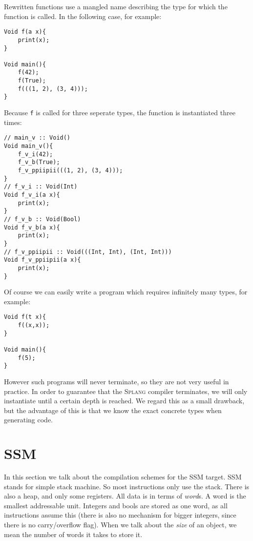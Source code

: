 \documentclass[14pt]{amsart}
\newcommand{\splang}{\textsc{Splang}\xspace}
\begin{document}
Rewritten functions use a mangled name describing the type for which the function is called. In the following case, for example:

\begin{lstlisting}
Void f(a x){
	print(x);
}

Void main(){
	f(42);
	f(True);
	f(((1, 2), (3, 4)));
}
\end{lstlisting}

Because \texttt{f} is called for three seperate types, the function is instantiated three times:

\begin{lstlisting}
// main_v :: Void()
Void main_v(){
	f_v_i(42);
	f_v_b(True);
	f_v_ppiipii(((1, 2), (3, 4)));
}
// f_v_i :: Void(Int)
Void f_v_i(a x){
	print(x);
}
// f_v_b :: Void(Bool)
Void f_v_b(a x){
	print(x);
}
// f_v_ppiipii :: Void(((Int, Int), (Int, Int)))
Void f_v_ppiipii(a x){
	print(x);
}
\end{lstlisting}

Of course we can easily write a program which requires infinitely many types, for example:

\begin{lstlisting}
Void f(t x){
	f((x,x));
}

Void main(){
	f(5);
}
\end{lstlisting}

However such programs will never terminate, so they are not very useful in practice. In order to guarantee that the \splang compiler terminates, we will only instantiate until a certain depth is reached. We regard this as a small drawback, but the advantage of this is that we know the exact concrete types when generating code.

\section{SSM}

In this section we talk about the compilation schemes for the SSM target. SSM stands for simple stack machine. So most instructions only use the stack. There is also a heap, and only some registers. All data is in terms of \emph{word}s. A word is the smallest addressable unit. Integers and bools are stored as one word, as all instructions assume this (there is also no mechanism for bigger integers, since there is no carry/overflow flag).
When we talk about the \emph{size} of an object, we mean the number of words it takes to store it.
\end{document}
